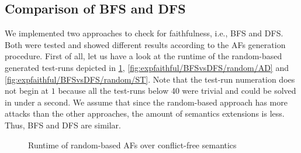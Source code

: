 \subsection{Comparison of BFS and DFS}
\label{subsec:faithfulComparisonBFSvsDFS}

\newcommand{\plotWidth}{10cm}
\newcommand{\plotHeight}{8cm}
\newcommand{\plotHeightSmall}{5cm}


We implemented two approaches to check for faithfulness, i.e., BFS and DFS. Both were tested and showed different results according to the AFs generation procedure. First of all, let us have a look at the runtime of the random-based generated test-runs depicted in \cref{fig:expfaithful/BFSvsDFS/random/CF}, \cref{fig:expfaithful/BFSvsDFS/random/AD} and \cref{fig:expfaithful/BFSvsDFS/random/ST}.
Note that the test-run numeration does not begin at $1$ because all the test-runs below 40 were trivial and could be solved in under a second. We assume that since the random-based approach has more attacks than the other approaches, the amount of semantics extensions is less. Thus, BFS and DFS are similar.




\begin{figure}[H]
    \centering
    \caption{Runtime of random-based AFs over conflict-free semantics}
    \label{fig:expfaithful/BFSvsDFS/random/CF}
\end{figure}


